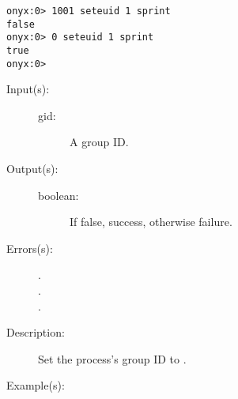 \begin{description}
\begin{description}
\begin{verbatim}
onyx:0> 1001 seteuid 1 sprint
false
onyx:0> 0 seteuid 1 sprint
true
onyx:0>
		\end{verbatim}
	\end{description}
\label{systemdict:setgid}
\item[{\onyxop{gid}{setgid}{boolean}}: ]
	\begin{description}\item[]
	\item[Input(s): ]
		\begin{description}\item[]
		\item[gid: ]
			A group ID.
		\end{description}
	\item[Output(s): ]
		\begin{description}\item[]
		\item[boolean: ]
			If false, success, otherwise failure.
		\end{description}
	\item[Errors(s): ]
		\begin{description}\item[]
		\item[.]
		\item[.]
		\item[.]
		\end{description}
	\item[Description: ]
		Set the process's group ID to .
	\item[Example(s): ]\begin{verbatim}


\end{verbatim}
\end{description}
\end{description}
